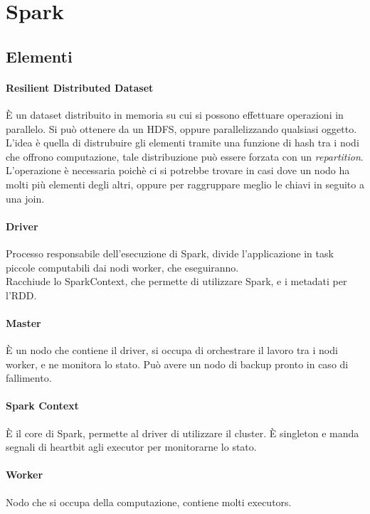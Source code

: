 \section{Spark}

\subsection{Elementi}

\paragraph{Resilient Distributed Dataset}
È un dataset distribuito in memoria su cui si possono effettuare operazioni in parallelo.
Si può ottenere da un HDFS, oppure parallelizzando qualsiasi oggetto.
L'idea è quella di distrubuire gli elementi tramite una funzione di hash tra i nodi 
che offrono computazione, tale distribuzione può essere forzata con un \emph{repartition}.
L'operazione è necessaria poichè ci si potrebbe trovare in casi dove un nodo ha molti più 
elementi degli altri, oppure per raggruppare meglio le chiavi in seguito a una join.

\paragraph{Driver}
Processo responsabile dell'esecuzione di Spark, divide l'applicazione in task piccole
computabili dai nodi worker, che eseguiranno.\\
Racchiude lo SparkContext, che permette di utilizzare Spark, e i metadati per l'RDD.

\paragraph{Master}
È un nodo che contiene il driver, si occupa di orchestrare il lavoro tra i nodi worker, 
e ne monitora lo stato. Può avere un nodo di backup pronto in caso di fallimento.

\paragraph{Spark Context}
È il core di Spark, permette al driver di utilizzare il cluster. È singleton e manda segnali 
di heartbit agli executor per monitorarne lo stato.

\paragraph{Worker}
Nodo che si occupa della computazione, contiene molti executors.

